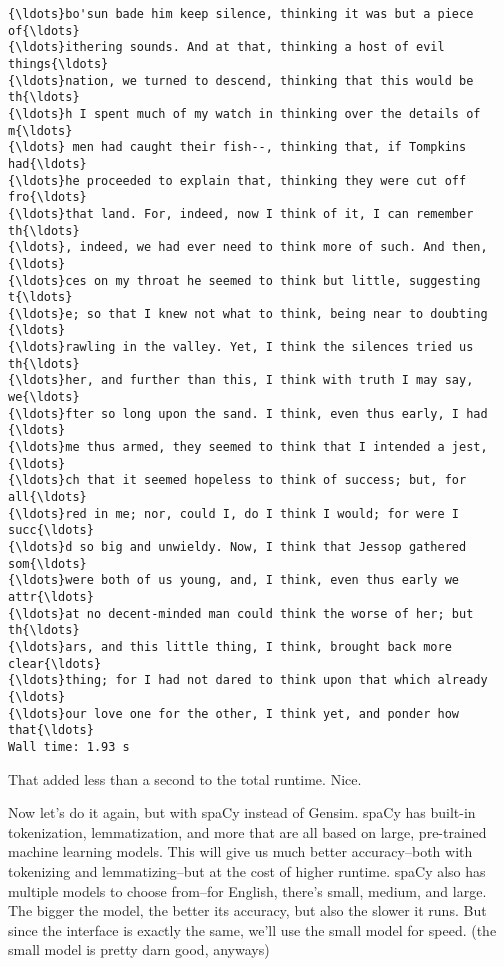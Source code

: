 \documentclass[11pt]{article}
\begin{document}
    \begin{Verbatim}[commandchars=\\\{\}]
{\ldots}bo'sun bade him keep silence, thinking it was but a piece of{\ldots}
{\ldots}ithering sounds. And at that, thinking a host of evil things{\ldots}
{\ldots}nation, we turned to descend, thinking that this would be th{\ldots}
{\ldots}h I spent much of my watch in thinking over the details of m{\ldots}
{\ldots} men had caught their fish--, thinking that, if Tompkins had{\ldots}
{\ldots}he proceeded to explain that, thinking they were cut off fro{\ldots}
{\ldots}that land. For, indeed, now I think of it, I can remember th{\ldots}
{\ldots}, indeed, we had ever need to think more of such. And then, {\ldots}
{\ldots}ces on my throat he seemed to think but little, suggesting t{\ldots}
{\ldots}e; so that I knew not what to think, being near to doubting {\ldots}
{\ldots}rawling in the valley. Yet, I think the silences tried us th{\ldots}
{\ldots}her, and further than this, I think with truth I may say, we{\ldots}
{\ldots}fter so long upon the sand. I think, even thus early, I had {\ldots}
{\ldots}me thus armed, they seemed to think that I intended a jest, {\ldots}
{\ldots}ch that it seemed hopeless to think of success; but, for all{\ldots}
{\ldots}red in me; nor, could I, do I think I would; for were I succ{\ldots}
{\ldots}d so big and unwieldy. Now, I think that Jessop gathered som{\ldots}
{\ldots}were both of us young, and, I think, even thus early we attr{\ldots}
{\ldots}at no decent-minded man could think the worse of her; but th{\ldots}
{\ldots}ars, and this little thing, I think, brought back more clear{\ldots}
{\ldots}thing; for I had not dared to think upon that which already {\ldots}
{\ldots}our love one for the other, I think yet, and ponder how that{\ldots}
Wall time: 1.93 s

    \end{Verbatim}

    That added less than a second to the total runtime. Nice.

Now let's do it again, but with spaCy instead of Gensim. spaCy has
built-in tokenization, lemmatization, and more that are all based on
large, pre-trained machine learning models. This will give us much
better accuracy--both with tokenizing and lemmatizing--but at the cost
of higher runtime. spaCy also has multiple models to choose from--for
English, there's small, medium, and large. The bigger the model, the
better its accuracy, but also the slower it runs. But since the
interface is exactly the same, we'll use the small model for speed. (the
small model is pretty darn good, anyways)
\end{document}

